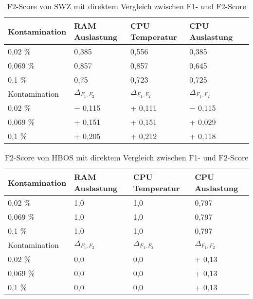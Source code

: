 \begin{table}[t!]
    \centering
    \renewcommand{\arraystretch}{1.5}
    \begin{tabular}{l|llll}
        Kontamination & RAM Auslastung & CPU Temperatur & CPU Auslastung \\
        \hline
        0,02 \%       & 0,385          & 0,556          & 0,385          \\
        0,069 \%      & 0,857          & 0,857          & 0,645          \\
        0,1 \%        & 0,75           & 0,723          & 0,725 \\
        \hline\hline
        Kontamination & $\Delta_{F_{1},F_{2}}$ & $\Delta_{F_{1},F_{2}}$ & $\Delta_{F_{1},F_{2}}$ \\
        \hline
        0,02 \%       & $-$ 0,115         & + 0,111          & $-$ 0,115          \\
        0,069 \%      & + 0,151          & + 0,151          & + 0,029          \\
        0,1 \%        & + 0,205          & + 0,212          & + 0,118
    \end{tabular}
    \caption{\centering F2-Score von SWZ mit direktem Vergleich zwischen F1- und F2-Score}
    \label{tab:swz_tests_f2}
\end{table}

\begin{table}[H]
    \centering
    \renewcommand{\arraystretch}{1.5}
    \begin{tabular}{l|lll}
    Kontamination   & RAM Auslastung    & CPU Temperatur    & CPU Auslastung \\
    \hline
    0,02 \%         & 1,0               & 1,0               & 0,797            \\
    0,069 \%        & 1,0               & 1,0               & 0,797          \\
    0,1 \%          & 1,0               & 1,0               & 0,797 \\
    \hline\hline
    Kontamination & $\Delta_{F_{1},F_{2}}$ & $\Delta_{F_{1},F_{2}}$ & $\Delta_{F_{1},F_{2}}$  \\
    \hline
    0,02 \%       & 0,0          & 0,0          & + 0,13          \\
    0,069 \%      & 0,0          & 0,0          & + 0,13          \\
    0,1 \%        & 0,0          & 0,0          & + 0,13
    \end{tabular}
    \caption{\centering F2-Score von HBOS mit direktem Vergleich zwischen F1- und F2-Score}
\label{tab:hbos_tests_f2}
\end{table}

